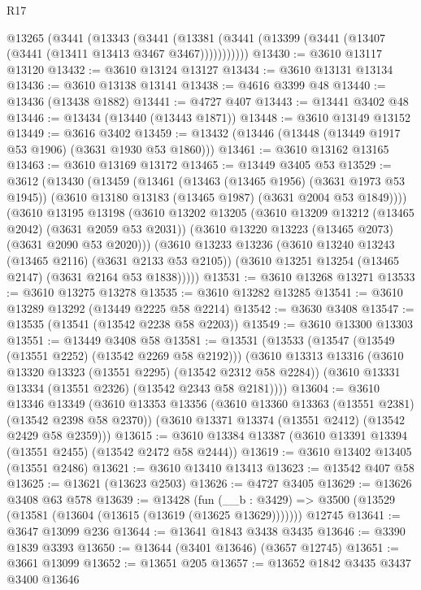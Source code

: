 \begin{lexlean}{R17}
\begin{coremodule}
    @13265
      (@3441
        (@13343
          (@3441 (@13381 (@3441 (@13399 (@3441 (@13407 (@3441 (@13411 @13413 @3467 @3467)))))))))))
@13430 := @3610 @13117 @13120
@13432 := @3610 @13124 @13127
@13434 := @3610 @13131 @13134
@13436 := @3610 @13138 @13141
@13438 := @4616 @3399 @48
@13440 := @13436 (@13438 @1882)
@13441 := @4727 @407
@13443 := @13441 @3402 @48
@13446 := @13434 (@13440 (@13443 @1871))
@13448 := @3610 @13149 @13152
@13449 := @3616 @3402
@13459 := @13432 (@13446 (@13448 (@13449 @1917 @53 @1906) (@3631 @1930 @53 @1860)))
@13461 := @3610 @13162 @13165
@13463 := @3610 @13169 @13172
@13465 := @13449 @3405 @53
@13529 := @3612
    (@13430
      (@13459
        (@13461
          (@13463 (@13465 @1956) (@3631 @1973 @53 @1945))
          (@3610 @13180 @13183 (@13465 @1987) (@3631 @2004 @53 @1849))))
      (@3610
        @13195
        @13198
        (@3610
          @13202
          @13205
          (@3610 @13209 @13212 (@13465 @2042) (@3631 @2059 @53 @2031))
          (@3610 @13220 @13223 (@13465 @2073) (@3631 @2090 @53 @2020)))
        (@3610
          @13233
          @13236
          (@3610 @13240 @13243 (@13465 @2116) (@3631 @2133 @53 @2105))
          (@3610 @13251 @13254 (@13465 @2147) (@3631 @2164 @53 @1838)))))
@13531 := @3610 @13268 @13271
@13533 := @3610 @13275 @13278
@13535 := @3610 @13282 @13285
@13541 := @3610 @13289 @13292 (@13449 @2225 @58 @2214)
@13542 := @3630 @3408
@13547 := @13535 (@13541 (@13542 @2238 @58 @2203))
@13549 := @3610 @13300 @13303
@13551 := @13449 @3408 @58
@13581 := @13531
    (@13533
      (@13547 (@13549 (@13551 @2252) (@13542 @2269 @58 @2192)))
      (@3610
        @13313
        @13316
        (@3610 @13320 @13323 (@13551 @2295) (@13542 @2312 @58 @2284))
        (@3610 @13331 @13334 (@13551 @2326) (@13542 @2343 @58 @2181))))
@13604 := @3610
    @13346
    @13349
    (@3610
      @13353
      @13356
      (@3610 @13360 @13363 (@13551 @2381) (@13542 @2398 @58 @2370))
      (@3610 @13371 @13374 (@13551 @2412) (@13542 @2429 @58 @2359)))
@13615 := @3610 @13384 @13387 (@3610 @13391 @13394 (@13551 @2455) (@13542 @2472 @58 @2444))
@13619 := @3610 @13402 @13405 (@13551 @2486)
@13621 := @3610 @13410 @13413
@13623 := @13542 @407 @58
@13625 := @13621 (@13623 @2503)
@13626 := @4727 @3405
@13629 := @13626 @3408 @63 @578
@13639 := @13428
    (fun (__b : @3429) => @3500 (@13529 (@13581 (@13604 (@13615 (@13619 (@13625 @13629)))))))
    @12745
@13641 := @3647 @13099 @236
@13644 := @13641 @1843 @3438 @3435
@13646 := @3390 @1839 @3393
@13650 := @13644 (@3401 @13646) (@3657 @12745)
@13651 := @3661 @13099
@13652 := @13651 @205
@13657 := @13652 @1842 @3435 @3437 @3400 @13646

\end{coremodule}
\end{lexlean}
